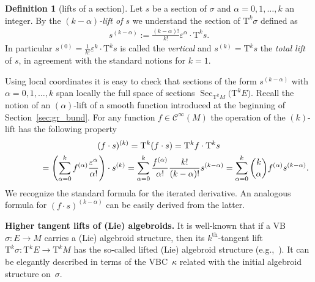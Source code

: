 \documentclass[pdftex]{sigma}
\newcommand{\ZM}{{VBC}} %
\newcommand{\thh}[1]{#1^{\mathrm{th}}} %
\newcommand{\Sec}{\operatorname{Sec}}
\newcommand{\ra}{\rightarrow}
\newcommand{\eps}{\varepsilon}
\newcommand{\TT}[1]{\mathrm{T}^{#1}} %
\newcommand{\Cf}{\mathcal{C}^\infty}
\numberwithin{equation}{section}
\theoremstyle{definition}
\newtheorem{df}[thm]{Definition}
\begin{document}
\begin{df}[lifts of a section]\label{def:lift_section} Let $s$ be a section of $\sigma$ and $\alpha=0,1,\hdots,k$ an integer. By the \emph{$(k-\alpha)$-lift of $s$} we understand the section of $\TT{k}\sigma$ defined as
\begin{gather*} s^{(k-\alpha)}:= \frac{(k-\alpha)!}{k!}\eps^\alpha\cdot \TT{k}s. \end{gather*}
In particular $s^{(0)}=\frac{1}{k!} \eps^k\cdot\TT{k}s$ is called the \emph{vertical} and $s^{(k)}=\TT{k}s$ the \emph{total lift} of $s$, in agreement with the standard notions for $k=1$.
\end{df}
Using local coordinates it is easy to check that sections of the form $s^{(k-\alpha)}$ with $\alpha=0,1,\hdots,k$ span locally the full space of sections $\Sec_{\TT{k}M}\big(\TT{k}E\big)$. Recall the notion of an $(\alpha)$-lift of a smooth function introduced at the beginning of Section~\ref{sec:gr_bund}. For any function $f\in\Cf(M)$ the operation of the $(k)$-lift has the following property
\begin{gather*}(f\cdot s)^{(k)}=\TT{k} (f\cdot s)=\TT{k} f\cdot\TT{k}s\\
\hphantom{(f\cdot s)^{(k)}}{} = \left(\sum_{\alpha=0}^kf^{(\alpha)}\frac{\eps^\alpha}{\alpha !}\right)\cdot s^{(k)}= \sum_{\alpha=0}^k
\frac{f^{(\alpha)}}{\alpha!}\frac{k!}{(k-\alpha)!}s^{(k-\alpha)} =\sum_{\alpha=0}^k \binom{k}{\alpha} f^{(\alpha)}s^{(k-\alpha)}.
\end{gather*}
We recognize the standard formula for the iterated derivative. An analogous formula for \mbox{$(f\cdot s)^{(k-\alpha)}$} can be easily derived from the latter.

{\bf Higher tangent lifts of (Lie) algebroids.} It is well-known that if a VB $\sigma\colon E\ra M$ carries a (Lie) algebroid structure, then its $\thh{k}$-tangent lift $\TT{k}\sigma\colon \TT{k} E\ra\TT{k} M$ has the so-called lifted (Lie) algebroid structure (e.g.,~\cite{K_N_Tangent_lifts_2013}). It can be elegantly described in terms of the \ZM\ $\kappa$ related with the initial algebroid structure on~$\sigma$.
\end{document}
